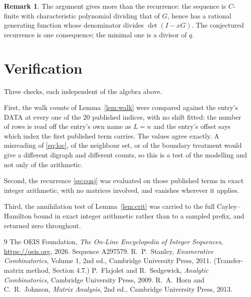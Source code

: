 \documentclass[11pt,a4paper]{article}
\theoremstyle{plain}
\theoremstyle{definition}
\newtheorem{remark}[theorem]{Remark}
\begin{document}
\begin{remark}
The argument gives more than the recurrence: the sequence is $C$-finite with characteristic
polynomial dividing that of $G$, hence has a rational generating function whose denominator
divides $\det(I-xG)$. The conjectured recurrence is one consequence; the minimal one is a
divisor of $q$.
\end{remark}

\section{Verification}

Three checks, each independent of the algebra above.

First, the walk counts of Lemma~\ref{lem:walk} were compared against the entry's DATA at
every one of the $20$ published indices, with no shift fitted: the number of rows is
read off the entry's own name as $L=n$ and the entry's offset says which index the first
published term carries. The values agree exactly. A misreading of \eqref{eq:loc}, of the
neighbour set, or of the boundary treatment would give a different digraph and different
counts, so this is a test of the modelling and not only of the arithmetic.

Second, the recurrence \eqref{eq:conj} was evaluated on those published terms in exact
integer arithmetic, with no matrices involved, and vanishes wherever it applies.

Third, the annihilation test of Lemma~\ref{lem:crit} was carried to the full
Cayley--Hamilton bound in exact integer arithmetic rather than to a sampled prefix, and
returned zero throughout.

\begin{thebibliography}{9}
 The OEIS Foundation, \emph{The On-Line Encyclopedia of Integer
Sequences}, \url{https://oeis.org}, 2026. Sequence A297579.
 R.~P.~Stanley, \emph{Enumerative Combinatorics}, Volume 1, 2nd ed.,
Cambridge University Press, 2011. (Transfer-matrix method, Section 4.7.)
 P.~Flajolet and R.~Sedgewick, \emph{Analytic Combinatorics}, Cambridge
University Press, 2009.
 R.~A.~Horn and C.~R.~Johnson, \emph{Matrix Analysis}, 2nd ed., Cambridge
University Press, 2013.
\end{thebibliography}
\end{document}
